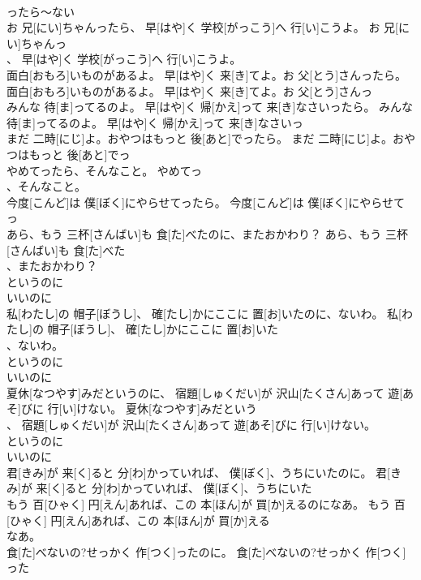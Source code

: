 \documentclass[8pt]{extreport}
\begin{document}
\begin{CJK}{UTF8}{min}
\\	ったら～ない
\\	お 兄[にい]ちゃんったら、 早[はや]く 学校[がっこう]へ 行[い]こうよ。	お 兄[にい]ちゃんっ
\\	、 早[はや]く 学校[がっこう]へ 行[い]こうよ。	
\\	面白[おもろ]いものがあるよ。 早[はや]く 来[き]てよ。お 父[とう]さんったら。	面白[おもろ]いものがあるよ。 早[はや]く 来[き]てよ。お 父[とう]さんっ
\\	みんな 待[ま]ってるのよ。 早[はや]く 帰[かえ]って 来[き]なさいったら。	みんな 待[ま]ってるのよ。 早[はや]く 帰[かえ]って 来[き]なさいっ
\\	まだ 二時[にじ]よ。おやつはもっと 後[あと]でったら。	まだ 二時[にじ]よ。おやつはもっと 後[あと]でっ
\\	やめてったら、そんなこと。	やめてっ
\\	、そんなこと。	
\\	今度[こんど]は 僕[ぼく]にやらせてったら。	今度[こんど]は 僕[ぼく]にやらせてっ
\\	あら、もう 三杯[さんばい]も 食[た]べたのに、またおかわり？	あら、もう 三杯[さんばい]も 食[た]べた
\\	、またおかわり？	
\\	というのに 
\\	いいのに
\\	私[わたし]の 帽子[ぼうし]、 確[たし]かにここに 置[お]いたのに、ないわ。	私[わたし]の 帽子[ぼうし]、 確[たし]かにここに 置[お]いた
\\	、ないわ。	
\\	というのに 
\\	いいのに
\\	夏休[なつやす]みだというのに、 宿題[しゅくだい]が 沢山[たくさん]あって 遊[あそ]びに 行[い]けない。	夏休[なつやす]みだという
\\	、 宿題[しゅくだい]が 沢山[たくさん]あって 遊[あそ]びに 行[い]けない。	
\\	というのに 
\\	いいのに
\\	君[きみ]が 来[く]ると 分[わ]かっていれば、 僕[ぼく]、うちにいたのに。	君[きみ]が 来[く]ると 分[わ]かっていれば、 僕[ぼく]、うちにいた
\\	もう 百[ひゃく] 円[えん]あれば、この 本[ほん]が 買[か]えるのになあ。	もう 百[ひゃく] 円[えん]あれば、この 本[ほん]が 買[か]える
\\	なあ。	
\\	食[た]べないの?せっかく 作[つく]ったのに。	食[た]べないの?せっかく 作[つく]った

\end{CJK}
\end{document}
